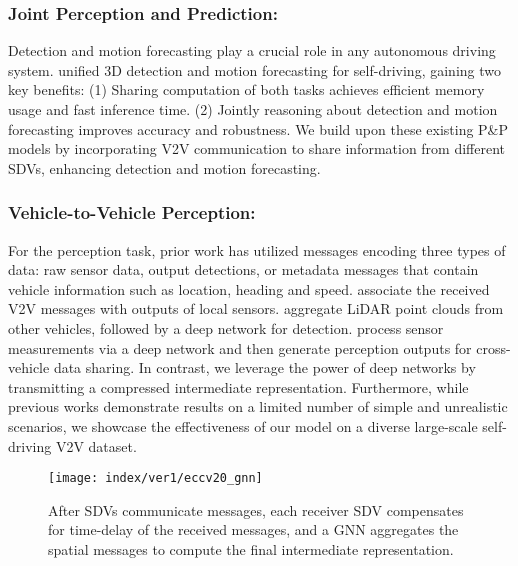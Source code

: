 \documentclass[runningheads]{llncs}
\newcommand{\pnp}{P\&P}
\begin{document}
\subsubsection{Joint Perception and Prediction:}
\label{sec:pnp_related}
Detection and motion forecasting play a crucial role in any autonomous driving system.
\cite{luo2018fast, casas2018intentnet,casas2019spatially,ilvm,pnpnet,li2020end} unified 3D detection and motion forecasting for self-driving, gaining  two key benefits:
(1) Sharing computation of both tasks achieves efficient memory usage and fast inference time.
(2) Jointly reasoning about detection and motion forecasting improves accuracy and robustness.
We build upon these existing \pnp{ }
models by  incorporating V2V communication to share information from different SDVs,  enhancing detection and motion forecasting.

\subsubsection{Vehicle-to-Vehicle Perception:}
For the perception task, prior work has utilized messages encoding three types of data: raw sensor data, output detections, or metadata messages that contain vehicle information such as location, heading and speed.
\cite{rockl2008v2v, rauch2012car2x} associate the received V2V messages with outputs of local sensors.
\cite{chen2019cooper} aggregate LiDAR point clouds from other vehicles, followed by a deep network for detection.
\cite{xiao2018multimedia, rawashdeh2018collaborative} process sensor measurements via a deep network and then generate perception outputs for cross-vehicle data sharing.
In contrast, we
leverage the
power of deep networks by transmitting a compressed intermediate representation.
Furthermore, while previous works demonstrate results on a limited number of simple and unrealistic scenarios, we showcase the effectiveness of our model on a diverse large-scale self-driving V2V  dataset.

\begin{figure*}[t]
  \centering
  \texttt{[image: index/ver1/eccv20\_gnn]}
\caption{After SDVs communicate  messages, each receiver SDV compensates for time-delay of the received messages, and a GNN aggregates the spatial messages to compute the final intermediate representation.}
  \label{fig:gnn}
\end{figure*}
\end{document}
